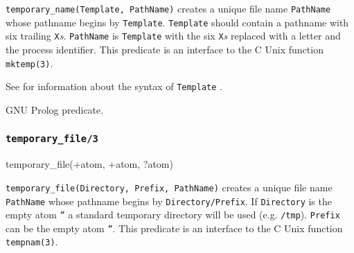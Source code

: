 \Description

\texttt{temporary\_name(Template, PathName)} creates a unique file name
\texttt{PathName} whose pathname begins by \texttt{Template}.
\texttt{Template} should contain a pathname with six trailing
\texttt{X}\emph{s}. \texttt{PathName} is \texttt{Template} with the six
\texttt{X}\emph{s} replaced with a letter and the process identifier. This
predicate is an interface to the C Unix function \texttt{mktemp(3)}.

See  for information about the syntax of
\texttt{Template} .

\begin{PlErrors}






\end{PlErrors}

\Portability

GNU Prolog predicate.

\subsubsection{\texttt{temporary\_file/3}}

\begin{TemplatesOneCol}
temporary\_file(+atom, +atom, ?atom)

\end{TemplatesOneCol}

\Description

\texttt{temporary\_file(Directory, Prefix, PathName)} creates a unique file
name \texttt{PathName} whose pathname begins by \texttt{Directory/Prefix}.
If \texttt{Directory} is the empty atom \texttt{''} a standard temporary
directory will be used (e.g. \texttt{/tmp}). \texttt{Prefix} can be the
empty atom \texttt{''}. This predicate is an interface to the C Unix
function \texttt{tempnam(3)}.

